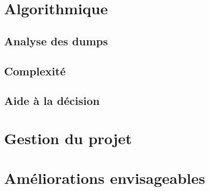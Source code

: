 \documentclass[a4paper,11pt]{article}
\begin{document}
\section{Algorithmique}
  \subsection{Analyse des dumps} \label{04-analyse} 
  \subsection{Complexité} 
  \subsection{Aide à la décision} 
\section{Gestion du projet}
  
\section{Améliorations envisageables}
  

\end{document}
